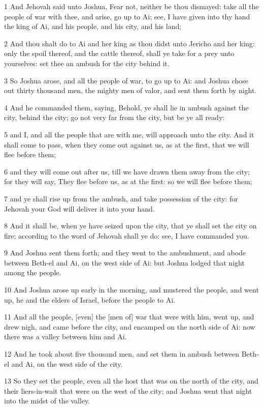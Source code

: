 \par 1 And Jehovah said unto Joshua, Fear not, neither be thou dismayed: take all the people of war with thee, and arise, go up to Ai; see, I have given into thy hand the king of Ai, and his people, and his city, and his land;
\par 2 And thou shalt do to Ai and her king as thou didst unto Jericho and her king: only the spoil thereof, and the cattle thereof, shall ye take for a prey unto yourselves: set thee an ambush for the city behind it.
\par 3 So Joshua arose, and all the people of war, to go up to Ai: and Joshua chose out thirty thousand men, the mighty men of valor, and sent them forth by night.
\par 4 And he commanded them, saying, Behold, ye shall lie in ambush against the city, behind the city; go not very far from the city, but be ye all ready:
\par 5 and I, and all the people that are with me, will approach unto the city. And it shall come to pass, when they come out against us, as at the first, that we will flee before them;
\par 6 and they will come out after us, till we have drawn them away from the city; for they will say, They flee before us, as at the first: so we will flee before them;
\par 7 and ye shall rise up from the ambush, and take possession of the city: for Jehovah your God will deliver it into your hand.
\par 8 And it shall be, when ye have seized upon the city, that ye shall set the city on fire; according to the word of Jehovah shall ye do: see, I have commanded you.
\par 9 And Joshua sent them forth; and they went to the ambushment, and abode between Beth-el and Ai, on the west side of Ai: but Joshua lodged that night among the people.
\par 10 And Joshua arose up early in the morning, and mustered the people, and went up, he and the elders of Israel, before the people to Ai.
\par 11 And all the people, [even] the [men of] war that were with him, went up, and drew nigh, and came before the city, and encamped on the north side of Ai: now there was a valley between him and Ai.
\par 12 And he took about five thousand men, and set them in ambush between Beth-el and Ai, on the west side of the city.
\par 13 So they set the people, even all the host that was on the north of the city, and their liers-in-wait that were on the west of the city; and Joshua went that night into the midst of the valley.
